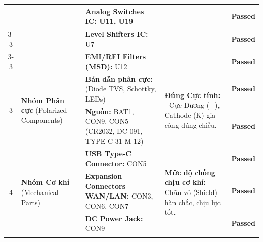 \begin{longtable}{|c|p{}|p{}|p{}|c|}
                    & & \textbf{Analog Switches IC:} U11, U19 
                    & & \textcolor{modern_blue}{\textbf{Passed}} \\ \cline{3-3} \cline{5-5}
            
                    & & \textbf{Level Shifters IC:} U7 
                    & & \textcolor{modern_blue}{\textbf{Passed}} \\ \cline{3-3} \cline{5-5}
            
                    & & \textbf{EMI/RFI Filters (MSD):} U12 
                    & & \textcolor{modern_blue}{\textbf{Passed}} \\ \hline
            
                \multirow{2}{*}{3} & \multirow{2}{0.15\textwidth}{\textbf{Nhóm Phân cực} \newline (Polarized Components)}
                    & \textbf{Bán dẫn phân cực:} \newline (Diode TVS, Schottky, LEDs)
                    & \multirow{2}{0.2\textwidth}{\textbf{Đúng Cực tính:} \newline - Cực Dương (+), Cathode (K) gia công đúng chiều.}
                    & \textcolor{modern_blue}{\textbf{Passed}} \\ \cline{3-3} \cline{5-5}
            
                    & & \textbf{Nguồn:} BAT1, CON9, CON5 \newline (CR2032, DC-091, TYPE-C-31-M-12)
                    & & \textcolor{modern_blue}{\textbf{Passed}} \\ \hline
            
                \multirow{8}{*}{4} & \multirow{8}{0.15\textwidth}{\textbf{Nhóm Cơ khí} \newline (Mechanical Parts)}
                    & \textbf{USB Type-C Connector:} CON5
                    & \multirow{8}{0.2\textwidth}{\textbf{Mức độ chống chịu cơ khí:} \newline - Chân vỏ (Shield) hàn chắc, chịu lực tốt.}
                    & \textcolor{modern_blue}{\textbf{Passed}} \\ \cline{3-3} \cline{5-5}
            
                    & & \textbf{Expansion Connectors WAN/LAN:} CON3, CON6, CON7
                    & & \textcolor{modern_blue}{\textbf{Passed}} \\ \cline{3-3} \cline{5-5}
            
                    & & \textbf{DC Power Jack:} CON9
                    & & \textcolor{modern_blue}{\textbf{Passed}} \\ \cline{3-3} \cline{5-5}
            

\end{longtable}
